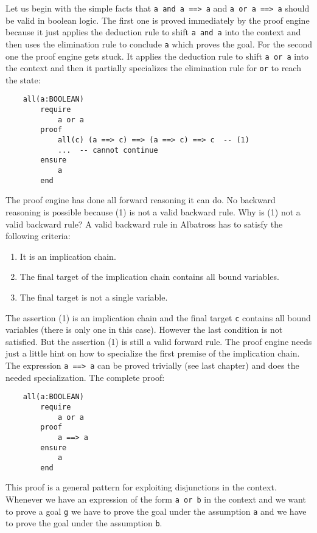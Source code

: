 Let us begin with the simple facts that \lstinline!a and a ==> a! and
\lstinline!a or a ==> a! should be valid in boolean logic. The first one is
proved immediately by the proof engine because it just applies the deduction
rule to shift \lstinline!a and a! into the context and then uses the
elimination rule to conclude \lstinline!a! which proves the goal. For the
second one the proof engine gets stuck. It applies the deduction rule to shift
\lstinline!a or a! into the context and then it partially specializes the
elimination rule for \lstinline!or! to reach the state:

\begin{lstlisting}
    all(a:BOOLEAN)
        require
            a or a
        proof
            all(c) (a ==> c) ==> (a ==> c) ==> c  -- (1)
            ...  -- cannot continue
        ensure
            a
        end
\end{lstlisting}

The proof engine has done all forward reasoning it can do. No backward
reasoning is possible because (1) is not a valid backward rule. Why is (1) not
a valid backward rule? A valid backward rule in Albatross has to satisfy the
following criteria:

\begin{enumerate}
\item It is an implication chain.
\item The final target of the implication chain contains all bound variables.
\item The final target is not a single variable.
\end{enumerate}

The assertion (1) is an implication chain and the final target \lstinline!c!
contains all bound variables (there is only one in this case). However the
last condition is not satisfied. But the assertion (1) is still a valid
forward rule. The proof engine needs just a little hint on how to specialize
the first premise of the implication chain. The expression \lstinline!a ==> a!
can be proved trivially (see last chapter) and does the needed
specialization. The complete proof:

\begin{lstlisting}
    all(a:BOOLEAN)
        require
            a or a
        proof
            a ==> a
        ensure
            a
        end
\end{lstlisting}

This proof is a general pattern for exploiting disjunctions in the
context. Whenever we have an expression of the form \lstinline!a or b! in the
context and we want to prove a goal \lstinline!g! we have to prove the
goal under the assumption \lstinline!a! and we have to prove the goal under
the assumption \lstinline!b!.


